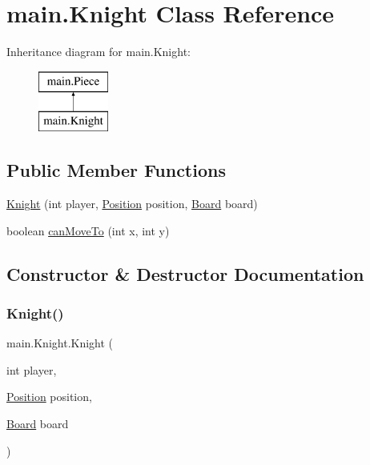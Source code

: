 \hypertarget{classmain_1_1_knight}{}\section{main.\+Knight Class Reference}
\label{classmain_1_1_knight}
Inheritance diagram for main.\+Knight\+:\begin{figure}[H]
\begin{center}
\leavevmode
\includegraphics[height=2.000000cm]{classmain_1_1_knight}
\end{center}
\end{figure}
\subsection*{Public Member Functions}
\begin{DoxyCompactItemize}
\item 
\hyperlink{classmain_1_1_knight_a63f17a48fdb2b1d2c42a4f5c62b98aac}{Knight} (int player, \hyperlink{classmain_1_1_position}{Position} position, \hyperlink{classmain_1_1_board}{Board} board)
\item 
boolean \hyperlink{classmain_1_1_knight_a7012b51c708121845a6fc1c911a412ba}{can\+Move\+To} (int x, int y)
\end{DoxyCompactItemize}


\subsection{Constructor \& Destructor Documentation}
\mbox{\label{classmain_1_1_knight_a63f17a48fdb2b1d2c42a4f5c62b98aac}} 
\subsubsection{\texorpdfstring{Knight()}{Knight()}}
{\footnotesize\ttfamily main.\+Knight.\+Knight (\begin{DoxyParamCaption}\item[{int}]{player,  }\item[{\hyperlink{classmain_1_1_position}{Position}}]{position,  }\item[{\hyperlink{classmain_1_1_board}{Board}}]{board }\end{DoxyParamCaption})}

